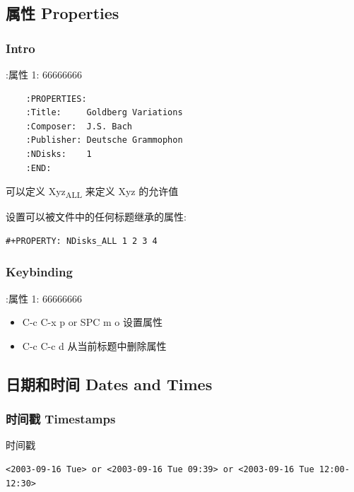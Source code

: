 \documentclass[11pt]{article}
\begin{document}
\subsection{属性 Properties}
\label{sec:org170b268}
\subsubsection{Intro}
\label{sec:org5b4cd1a}
:属性 1:    66666666
\begin{verbatim}
    :PROPERTIES:
    :Title:     Goldberg Variations
    :Composer:  J.S. Bach
    :Publisher: Deutsche Grammophon
    :NDisks:    1
    :END:
\end{verbatim}

可以定义 Xyz\textsubscript{ALL} 来定义 Xyz 的允许值

设置可以被文件中的任何标题继承的属性:
\begin{verbatim}
#+PROPERTY: NDisks_ALL 1 2 3 4
\end{verbatim}

\subsubsection{Keybinding}
\label{sec:orgc16d59b}
:属性 1:    66666666
\begin{itemize}
\item C-c C-x p or SPC m o
设置属性
\item C-c C-c d
从当前标题中删除属性
\end{itemize}

\subsection{日期和时间 Dates and Times}
\label{sec:orgbe3f332}

\subsubsection{时间戳 Timestamps}
\label{sec:org27dce46}
时间戳
\begin{verbatim}
<2003-09-16 Tue> or <2003-09-16 Tue 09:39> or <2003-09-16 Tue 12:00-12:30>
\end{verbatim}
\end{document}
